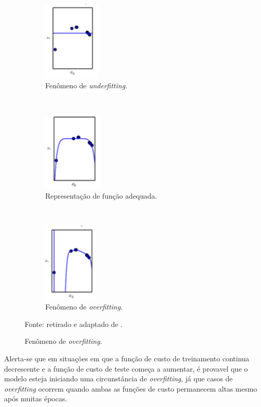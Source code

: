 \begin{figure}[H]
   \caption{Fenômenos de \textit{underfitting} e \textit{overfitting}.}
   \centering
   \label{deep:fig:5}
    \begin{subfigure}[t]{0.45\textwidth}
        \centering
        \includegraphics[height=1.5in]{recursos/imagens/deep/under.png}
        \caption{Fenômeno de \textit{underfitting}.}
        \label{deep:fig:5.1}
    \end{subfigure}
    ~ 
    \begin{subfigure}[t]{0.45\textwidth}
        \centering
        \includegraphics[height=1.5in]{recursos/imagens/deep/apx.png}
        \caption{Representação de função adequada.}
        \label{deep:fig:5.2}
    \end{subfigure}
    ~
    \begin{subfigure}[t]{0.45\textwidth}
        \centering
        \includegraphics[height=1.5in]{recursos/imagens/deep/over.png}
        \caption{Fenômeno de \textit{overfitting}.}
        \label{deep:fig:5.3}
    \end{subfigure}

    \vspace*{1 cm}
    Fonte: retirado e adaptado de \cite{Goodfellow2016}.
\end{figure}

Alerta-se que em situações em que a função de custo de treinamento continua decrescente e a função de custo de teste começa a aumentar, é provavel que o modelo esteja iniciando uma circunstância de \textit{overfitting}, já que casos de \textit{overfitting} ocorrem quando ambas as funções de custo permanecem altas mesmo após muitas épocas.

